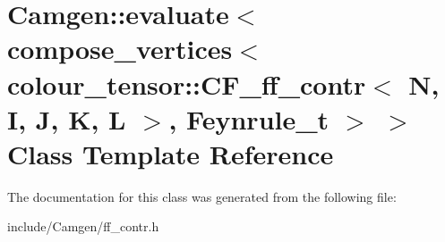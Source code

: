\hypertarget{a00161}{}\section{Camgen\+:\+:evaluate$<$ compose\+\_\+vertices$<$ colour\+\_\+tensor\+:\+:C\+F\+\_\+ff\+\_\+contr$<$ N, I, J, K, L $>$, Feynrule\+\_\+t $>$ $>$ Class Template Reference}
\label{a00161}


The documentation for this class was generated from the following file\+:\begin{DoxyCompactItemize}
\item 
include/\+Camgen/ff\+\_\+contr.\+h\end{DoxyCompactItemize}
